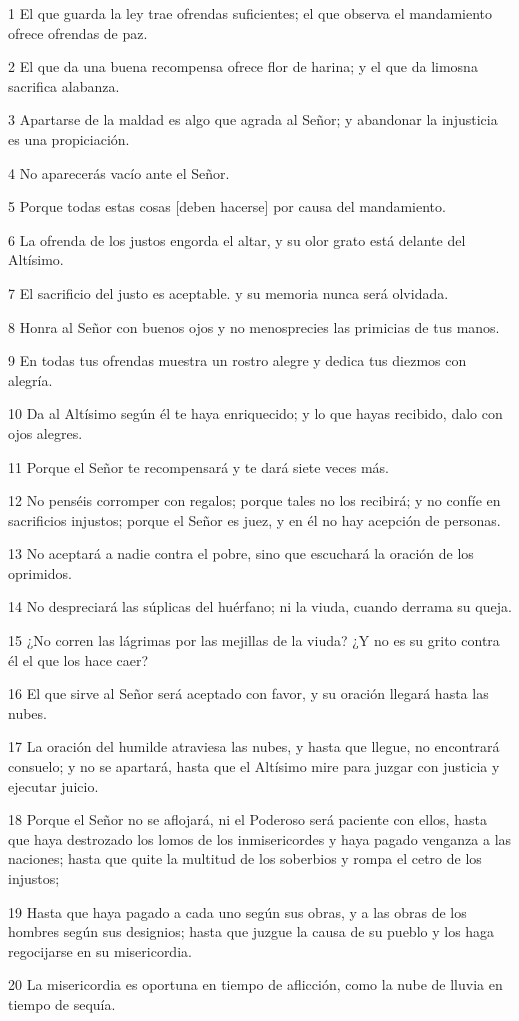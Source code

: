 \par 1 El que guarda la ley trae ofrendas suficientes; el que observa el mandamiento ofrece ofrendas de paz.
\par 2 El que da una buena recompensa ofrece flor de harina; y el que da limosna sacrifica alabanza.
\par 3 Apartarse de la maldad es algo que agrada al Señor; y abandonar la injusticia es una propiciación.
\par 4 No aparecerás vacío ante el Señor.
\par 5 Porque todas estas cosas [deben hacerse] por causa del mandamiento.
\par 6 La ofrenda de los justos engorda el altar, y su olor grato está delante del Altísimo.
\par 7 El sacrificio del justo es aceptable. y su memoria nunca será olvidada.
\par 8 Honra al Señor con buenos ojos y no menosprecies las primicias de tus manos.
\par 9 En todas tus ofrendas muestra un rostro alegre y dedica tus diezmos con alegría.
\par 10 Da al Altísimo según él te haya enriquecido; y lo que hayas recibido, dalo con ojos alegres.
\par 11 Porque el Señor te recompensará y te dará siete veces más.
\par 12 No penséis corromper con regalos; porque tales no los recibirá; y no confíe en sacrificios injustos; porque el Señor es juez, y en él no hay acepción de personas.
\par 13 No aceptará a nadie contra el pobre, sino que escuchará la oración de los oprimidos.
\par 14 No despreciará las súplicas del huérfano; ni la viuda, cuando derrama su queja.
\par 15 ¿No corren las lágrimas por las mejillas de la viuda? ¿Y no es su grito contra él el que los hace caer?
\par 16 El que sirve al Señor será aceptado con favor, y su oración llegará hasta las nubes.
\par 17 La oración del humilde atraviesa las nubes, y hasta que llegue, no encontrará consuelo; y no se apartará, hasta que el Altísimo mire para juzgar con justicia y ejecutar juicio.
\par 18 Porque el Señor no se aflojará, ni el Poderoso será paciente con ellos, hasta que haya destrozado los lomos de los inmisericordes y haya pagado venganza a las naciones; hasta que quite la multitud de los soberbios y rompa el cetro de los injustos;
\par 19 Hasta que haya pagado a cada uno según sus obras, y a las obras de los hombres según sus designios; hasta que juzgue la causa de su pueblo y los haga regocijarse en su misericordia.
\par 20 La misericordia es oportuna en tiempo de aflicción, como la nube de lluvia en tiempo de sequía.

